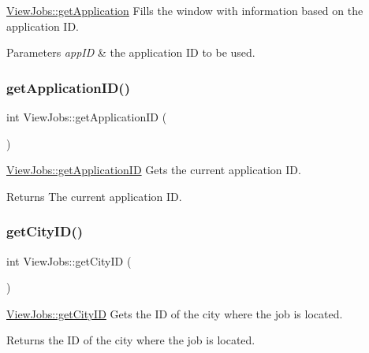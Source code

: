 \mbox{\hyperlink{class_view_jobs_ae9c1c806aa1dd5082b38a1dc9cbec39e}{View\+Jobs\+::get\+Application}} Fills the window with information based on the application ID. 


\begin{DoxyParams}{Parameters}
{\em app\+ID} & the application ID to be used. \\
\hline
\end{DoxyParams}
\mbox{\label{class_view_jobs_a086650882ad80acb4074cf697f8cddcb}} 
\subsubsection{\texorpdfstring{get\+Application\+I\+D()}{getApplicationID()}}
{\footnotesize\ttfamily int View\+Jobs\+::get\+Application\+ID (\begin{DoxyParamCaption}{ }\end{DoxyParamCaption})}



\mbox{\hyperlink{class_view_jobs_a086650882ad80acb4074cf697f8cddcb}{View\+Jobs\+::get\+Application\+ID}} Gets the current application ID. 

\begin{DoxyReturn}{Returns}
The current application ID. 
\end{DoxyReturn}
\mbox{\label{class_view_jobs_adcafeca350b21a033aa630e042ee7947}} 
\subsubsection{\texorpdfstring{get\+City\+I\+D()}{getCityID()}}
{\footnotesize\ttfamily int View\+Jobs\+::get\+City\+ID (\begin{DoxyParamCaption}{ }\end{DoxyParamCaption})}



\mbox{\hyperlink{class_view_jobs_adcafeca350b21a033aa630e042ee7947}{View\+Jobs\+::get\+City\+ID}} Gets the ID of the city where the job is located. 

\begin{DoxyReturn}{Returns}
the ID of the city where the job is located. 
\end{DoxyReturn}
\mbox{\label{class_view_jobs_a88d7c0a7a79bc7a7e02b524587983bf8}} 
